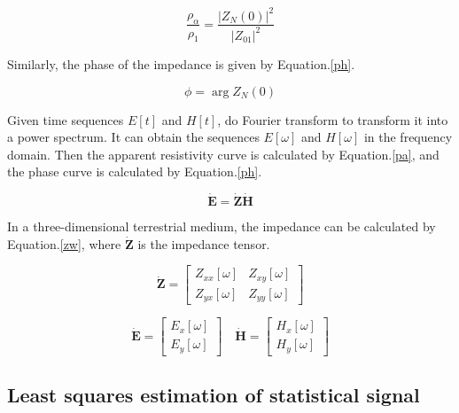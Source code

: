 \documentclass[9pt,a4paper,twoside]{rho-class/rho}
\begin{document}
\begin{equation}
    \label{pa2}
    \dfrac{\rho_\alpha}{\rho_1}=\dfrac{|Z_N(0)|^2}{|Z_{01}|^2}
\end{equation}

Similarly, the phase of the impedance is given by Equation.\eqref{ph}.

\begin{equation}
    \label{ph}
    \phi =\arg Z_N(0)
\end{equation}

Given time sequences $E[t]$ and $H[t]$, do Fourier transform to transform it into a power spectrum. It can obtain the sequences $E[\omega]$ and $H[\omega]$ in the frequency domain. Then the apparent resistivity curve is calculated by Equation.\eqref{pa}, and the phase curve is calculated by Equation.\eqref{ph}.

\begin{equation}
    \label{zw}
    \dot{\bm{E}} = \dot{\mathbf{Z}}\dot{\bm{H}}
\end{equation}

In a three-dimensional terrestrial medium, the impedance can be calculated by Equation.\eqref{zw}, where $\dot{\mathbf{Z}}$ is the impedance tensor.

\begin{equation}
    \label{ztensor}
    \dot{\mathbf{Z}}=\begin{bmatrix}
        {Z}_{xx}[\omega] & {Z}_{xy}[\omega] \\
        {Z}_{yx}[\omega] & {Z}_{yy}[\omega]
    \end{bmatrix}
\end{equation}

\begin{equation}
    \label{ehtensor}
    \dot{\bm{E}}=\begin{bmatrix}
        E_{x}[\omega]\\
        E_{y}[\omega]
    \end{bmatrix}\quad
    \dot{\bm{H}}=\begin{bmatrix}
        H_{x}[\omega]\\
        H_{y}[\omega]
    \end{bmatrix}
\end{equation}

\subsection{Least squares estimation of statistical signal} 
\end{document}
